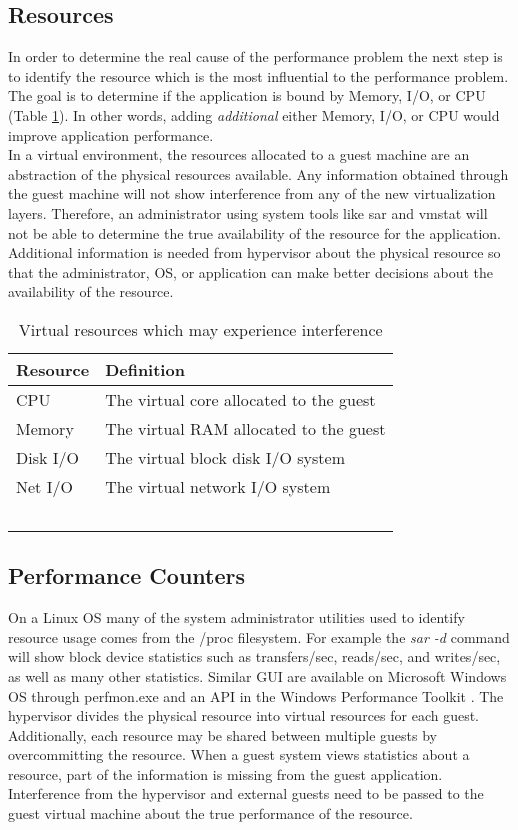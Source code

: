 \subsection{Resources}
In order to determine the real cause of the performance problem the next step is to identify the resource which is the most influential to the performance problem.  
The goal is to determine if the application is bound by Memory, I/O, or CPU (Table \ref{tab:resources}).  In other words, adding \emph{additional} either Memory, I/O, or CPU would improve application performance. \\
\indent In a virtual environment, the resources allocated to a guest machine are an abstraction of the physical resources available.  
Any information obtained through the guest machine will not show interference from any of the new virtualization layers.  
Therefore, an administrator using system tools like sar and vmstat will not be able to determine the true availability of the resource for the application.  
Additional information is needed from hypervisor about the physical resource so that the administrator, OS, or application can make better decisions about the availability of the resource. 

\begin{table}
  \begin{tabular}{ l p{10cm} }
    Resource & Definition \\
    \hline
    CPU & The virtual core allocated to the guest \\
    Memory & The virtual RAM allocated to the guest \\
    Disk I/O & The virtual block disk I/O system \\
    Net I/O & The virtual network I/O system \\
    \hline
  \end{tabular}
\caption{Virtual resources which may experience interference}
\label{tab:resources}
\end{table}

\subsection{Performance Counters}
On a Linux OS many of the system administrator utilities used to identify resource usage comes from the /proc filesystem. 
For example the \emph{sar -d} command will show block device statistics such as transfers/sec, reads/sec, and writes/sec, as well as many other statistics.  
Similar GUI are available on Microsoft Windows OS through perfmon.exe and an API in the Windows Performance Toolkit \cite{winperf}. 
The hypervisor divides the physical resource into virtual resources for each guest.  
Additionally, each resource may be shared between multiple guests by overcommitting the resource.  
When a guest system views statistics about a resource, part of the information is missing from the guest application.  
Interference from the hypervisor and external guests need to be passed to the guest virtual machine about the true performance of the resource. 

